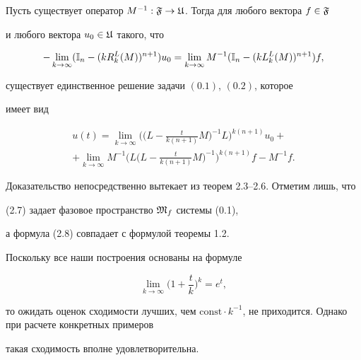 \begin{thms}


Пусть существует оператор $M^{-1} :


{\frak F}\to {\frak U}$. Тогда для любого вектора $f\in{\frak F}$


и любого вектора $u_0\in {\frak U}$ такого, что


\begin{equation}


-\lim_{k\to\infty} ({\Bbb I}_n - (k R_k^L (M))^{n+1}) u_0 =%


\lim_{k\to\infty} M^{-1} ({\Bbb I}_n -(k L^L_k (M))^{n+1} )f,


\end{equation}


существует единственное решение задачи $(0.1)$, $(0.2)$, которое


имеет вид


\begin{multline}


u(t) = \lim_{k\to\infty} \bigg(\bigg(L -


\displaystyle{\frac{t}{k(n+1)}} M\bigg)^{-1} L\bigg)^{k(n+1)} u_0 + \\ +


\lim_{k\to\infty} M^{-1} \bigg(L\bigg(L


- \displaystyle{\frac{t}{k(n+1)}} M\bigg)^{-1} \bigg)^{k(n+1)}f-M^{-1} f.


\end{multline}


\end{thms}





Доказательство непосредственно вытекает из теорем 2.3--2.6. Отметим лишь, что


(2.7) задает фазовое пространство  ${\frak M}_f$ системы (0.1),


а формула (2.8) совпадает с формулой теоремы 1.2.





\begin{notes}


Поскольку все наши построения основаны на формуле


$$


\lim_{k\to\infty}\bigg(1 + \frac{t}{k}\bigg)^k = e^t,


$$


то ожидать оценок сходимости лучших, чем $\mathrm{const}\cdot


k^{-1}$, не приходится. Однако при расчете конкретных примеров


такая сходимость вполне удовлетворительна.


\end{notes}








